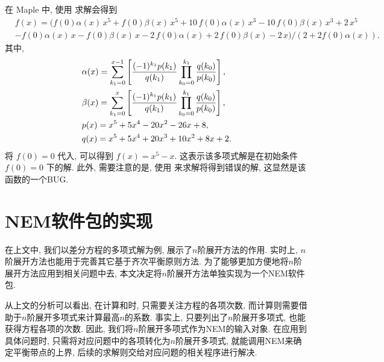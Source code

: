 \begin{example}
在 Maple 中, 使用  求解会得到
\begin{equation}
\begin{split}
    &f(x)=(f \left( 0 \right) \alpha(x)\,{x}^{5}+f \left( 0 \right) \beta(x)\,{x}^{5}+10\,f \left( 0 \right) \alpha(x)\,{x}^{3}-10\,f \left( 0 \right) \beta(x)\,{x}^{3}+2\,{x}^{5}\\
    &-f \left( 0 \right) \alpha(x)\,x-f \left( 0 \right) \beta(x)\,x-2\,f \left( 0 \right) \alpha(x)+2\,f \left( 0 \right) \beta(x)-2\,x)/(2+2f(0)\alpha(x)) . 
\end{split} \label{rasol_real}
\end{equation}
其中,
\begin{equation}
\begin{split}
&\alpha(x)=\sum_{k_1=0}^{x-1}\left[
    \frac{(-1)^{k_1}p(k_1)}{q(k_1)}\prod_{k_0=0}^{k_1}{
        \frac{q(k_0)}{p(k_0)}
    }
\right], \\
&\beta(x)=\sum_{k_1=0}^{x}\left[
    \frac{(-1)^{k_1}p(k_1)}{q(k_1)}\prod_{k_0=0}^{k_1}{
        \frac{q(k_0)}{p(k_0)}
    }
\right], \\
&p(x)=x^5+5x^4-20x^2-26x+8, \\
&q(x)=x^5+5x^4+20x^3+10x^2+8x+2. 
\end{split}
\end{equation}
将 $f(0)=0$ 代入, 可以得到 $f(x)=x^5-x$. 这表示该多项式解是在初始条件 $f(0)=0$ 下的解. 此外, 需要注意的是, 使用  来求解将得到错误的解, 这显然是该函数的一个BUG. 
\end{example}

\section{NEM软件包的实现}\label{ch4sec3}
在上文中, 我们以差分方程的多项式解为例, 展示了$n$阶展开方法的作用. 实时上, $n$阶展开方法也能用于完善其它基于齐次平衡原则方法. 为了能够更加方便地将$n$阶展开方法应用到相关问题中去, 本文决定将$n$阶展开方法单独实现为一个NEM软件包.

从上文的分析可以看出, 在计算\BPone{}和\BPtwo{}时, 只需要关注方程的各项次数, 而计算\BPthree{}则需要借助于$n$阶展开多项式来计算最高$n$的系数. 事实上, 只要列出了$n$阶展开多项式, 也能获得方程各项的次数. 因此, 我们将$n$阶展开多项式作为NEM的输入对象. 在应用到具体问题时, 只需将对应问题中的各项转化为$n$阶展开多项式, 就能调用NEM来确定平衡带点的上界, 后续的求解则交给对应问题的相关程序进行解决. 

